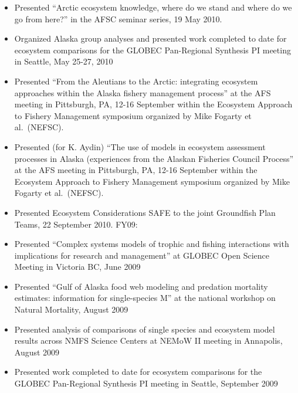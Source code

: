 \documentclass[11pt, a4paper]{awesome-cv}
\providecommand{\tightlist}{%
	\setlength{\itemsep}{0pt}\setlength{\parskip}{0pt}}
\begin{document}
\begin{itemize}
\tightlist
\item
  Presented ``Arctic ecosystem knowledge, where do we stand and where do
  we go from here?'' in the AFSC seminar series, 19 May 2010.
\item
  Organized Alaska group analyses and presented work completed to date
  for ecosystem comparisons for the GLOBEC Pan-Regional Synthesis PI
  meeting in Seattle, May 25-27, 2010
\item
  Presented ``From the Aleutians to the Arctic: integrating ecosystem
  approaches within the Alaska fishery management process'' at the AFS
  meeting in Pittsburgh, PA, 12-16 September within the Ecosystem
  Approach to Fishery Management symposium organized by Mike Fogarty et
  al.~(NEFSC).
\item
  Presented (for K. Aydin) ``The use of models in ecosystem assessment
  processes in Alaska (experiences from the Alaskan Fisheries Council
  Process'' at the AFS meeting in Pittsburgh, PA, 12-16 September within
  the Ecosystem Approach to Fishery Management symposium organized by
  Mike Fogarty et al.~(NEFSC).
\item
  Presented Ecosystem Considerations SAFE to the joint Groundfish Plan
  Teams, 22 September 2010. FY09:
\item
  Presented ``Complex systems models of trophic and fishing interactions
  with implications for research and management'' at GLOBEC Open Science
  Meeting in Victoria BC, June 2009
\item
  Presented ``Gulf of Alaska food web modeling and predation mortality
  estimates: information for single-species M'' at the national workshop
  on Natural Mortality, August 2009
\item
  Presented analysis of comparisons of single species and ecosystem
  model results across NMFS Science Centers at NEMoW II meeting in
  Annapolis, August 2009
\item
  Presented work completed to date for ecosystem comparisons for the
  GLOBEC Pan-Regional Synthesis PI meeting in Seattle, September 2009
\end{itemize}
\end{document}
